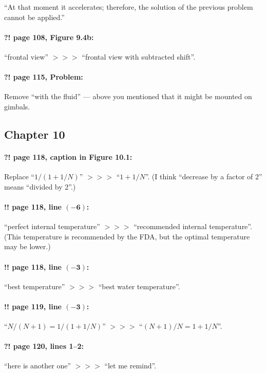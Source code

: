 \documentclass[twoside]{article}
\begin{document}
“At that moment it accelerates; therefore, the solution of the previous problem cannot be applied.”

\paragraph{?! page 108, Figure 9.4b:} “frontal view” $>\!>\!>$ “frontal view with subtracted shift”.

\paragraph{?! page 115, Problem:} Remove “with the fluid” — above you mentioned that it might be mounted on gimbals.

\subsection*{Chapter 10}

\paragraph{?! page 118, caption in Figure 10.1:} Replace ``$1/(1+1/N)$'' $>\!>\!>$ ``$1+1/N$''. (I think ``decrease by a factor of 2'' means ``divided by 2''.)

\paragraph{!! page 118, line $\bm{(-6)}$:} ``perfect internal temperature'' $>\!>\!>$ ``recommended internal temperature''. (This temperature is recommended by the FDA, but the optimal temperature may be lower.)

\paragraph{!! page 118, line $\bm{(-3)}$:} ``best temperature'' $>\!>\!>$ ``best water temperature''.

\paragraph{!! page 119, line $\bm{(-3)}$:} ``$N/(N+1)=1/(1+1/N)$'' $>\!>\!>$ ``$(N+1)/N = 1 + 1/N$''.

\paragraph{?! page 120, lines 1--2:} ``here is another one'' $>\!>\!>$ ``let me remind''.
\end{document}

